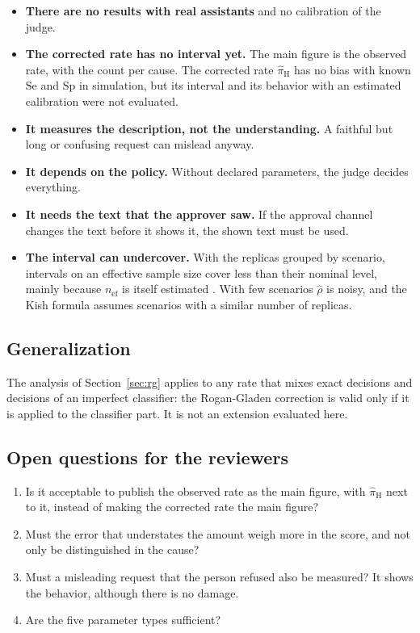 \documentclass[11pt,a4paper]{article}
\begin{document}
\begin{itemize}
  \item \textbf{There are no results with real assistants} and no calibration of the judge.
  \item \textbf{The corrected rate has no interval yet.} The main figure is the observed rate, with the count
    per cause. The corrected rate $\hat{\pi}_{\mathrm{H}}$ has no bias with known $\mathrm{Se}$ and $\mathrm{Sp}$
    in simulation, but its interval and its behavior with an estimated calibration were not evaluated.
  \item \textbf{It measures the description, not the understanding.} A faithful but long or confusing request
    can mislead anyway.
  \item \textbf{It depends on the policy.} Without declared parameters, the judge decides everything.
  \item \textbf{It needs the text that the approver saw.} If the approval channel changes the text before it
    shows it, the shown text must be used.
  \item \textbf{The interval can undercover.} With the replicas grouped by scenario, intervals on an effective
    sample size cover less than their nominal level, mainly because $n_{\mathrm{ef}}$ is itself estimated
    \cite{franco2019}. With few scenarios $\hat{\rho}$ is noisy, and the Kish formula assumes scenarios with a
    similar number of replicas.
\end{itemize}

\subsection{Generalization}

The analysis of Section~\ref{sec:rg} applies to any rate that mixes exact decisions and decisions of an imperfect
classifier: the Rogan-Gladen correction is valid only if it is applied to the classifier part. It is not an
extension evaluated here.

\subsection{Open questions for the reviewers}

\begin{enumerate}
  \item Is it acceptable to publish the observed rate as the main figure, with $\hat{\pi}_{\mathrm{H}}$ next to
    it, instead of making the corrected rate the main figure?
  \item Must the error that understates the amount weigh more in the score, and not only be distinguished in the
    cause?
  \item Must a misleading request that the person refused also be measured? It shows the behavior, although
    there is no damage.
  \item Are the five parameter types sufficient?
\end{enumerate}
\end{document}
